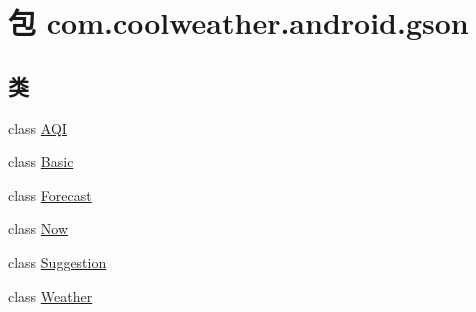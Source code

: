 \hypertarget{namespacecom_1_1coolweather_1_1android_1_1gson}{}\section{包 com.\+coolweather.\+android.\+gson}
\label{namespacecom_1_1coolweather_1_1android_1_1gson}
\subsection*{类}
\begin{DoxyCompactItemize}
\item 
class \mbox{\hyperlink{classcom_1_1coolweather_1_1android_1_1gson_1_1_a_q_i}{A\+QI}}
\item 
class \mbox{\hyperlink{classcom_1_1coolweather_1_1android_1_1gson_1_1_basic}{Basic}}
\item 
class \mbox{\hyperlink{classcom_1_1coolweather_1_1android_1_1gson_1_1_forecast}{Forecast}}
\item 
class \mbox{\hyperlink{classcom_1_1coolweather_1_1android_1_1gson_1_1_now}{Now}}
\item 
class \mbox{\hyperlink{classcom_1_1coolweather_1_1android_1_1gson_1_1_suggestion}{Suggestion}}
\item 
class \mbox{\hyperlink{classcom_1_1coolweather_1_1android_1_1gson_1_1_weather}{Weather}}
\end{DoxyCompactItemize}
